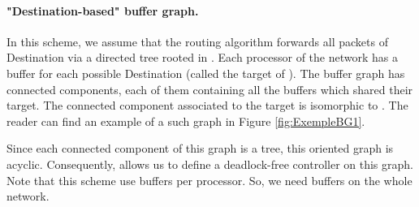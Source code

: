 \documentclass[11pt]{article}
\begin{document}
\paragraph{"Destination-based" buffer graph.} In this scheme, we assume that the routing algorithm forwards all packets of Destination  via a directed tree  rooted in . Each processor  of the network has a buffer  for each possible Destination  (called the target of ). The buffer graph has  connected components, each of them containing all the buffers which shared their target. The connected component associated to the target  is isomorphic to . The reader can find an example of a such graph in Figure \ref{fig:ExempleBG1}.

Since each connected component of this graph is a tree, this oriented graph is acyclic. Consequently, \cite{MS78} allows us to define a deadlock-free controller on this graph. Note that this scheme use  buffers per processor. So, we need  buffers on the whole network.
\end{document}
